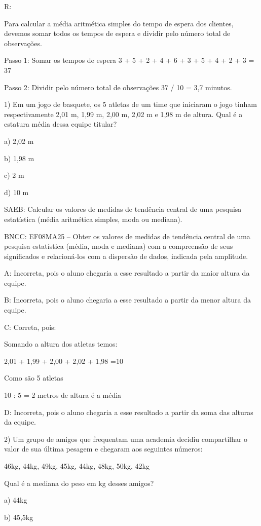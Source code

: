R:

Para calcular a média aritmética simples do tempo de espera dos
clientes, devemos somar todos os tempos de espera e dividir pelo número
total de observações.

Passo 1: Somar os tempos de espera 3 + 5 + 2 + 4 + 6 + 3 + 5 + 4 + 2 + 3
= 37

Passo 2: Dividir pelo número total de observações 37 / 10 = 3,7 minutos.


1) Em um jogo de basquete, os 5 atletas de um time que iniciaram o jogo
tinham respectivamente 2,01 m, 1,99 m, 2,00 m, 2,02 m e 1,98 m de
altura. Qual é a estatura média dessa equipe titular?

a) 2,02 m

b) 1,98 m

c) 2 m

d) 10 m

SAEB: Calcular os valores de medidas de tendência central de uma
pesquisa estatística (média aritmética simples, moda ou mediana).

BNCC: EF08MA25 -- Obter os valores de medidas de tendência central de
uma pesquisa estatística (média, moda e mediana) com a compreensão de
seus significados e relacioná-los com a dispersão de dados, indicada
pela amplitude.

A: Incorreta, pois o aluno chegaria a esse resultado a partir da maior
altura da equipe.

B: Incorreta, pois o aluno chegaria a esse resultado a partir da menor
altura da equipe.

C: Correta, pois:

Somando a altura dos atletas temos:

2,01 + 1,99 + 2,00 + 2,02 + 1,98 =10

Como são 5 atletas

10 : 5 = 2 metros de altura é a média

D: Incorreta, pois o aluno chegaria a esse resultado a partir da soma
das alturas da equipe.

2) Um grupo de amigos que frequentam uma academia decidiu compartilhar o
valor de sua última pesagem e chegaram aos seguintes números:

46kg, 44kg, 49kg, 45kg, 44kg, 48kg, 50kg, 42kg

Qual é a mediana do peso em kg desses amigos?

a) 44kg

b) 45,5kg

